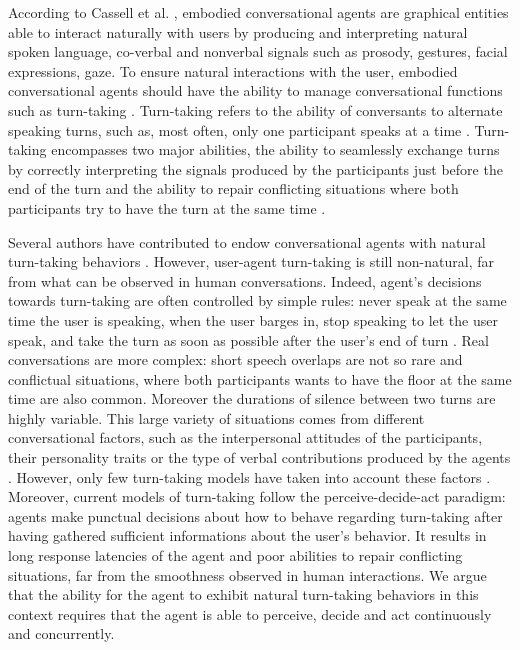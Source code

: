 According to Cassell et al. \cite{cassell_embodiment_1999}, embodied conversational agents are graphical entities able to interact naturally with users by producing and interpreting natural spoken language, co-verbal and nonverbal signals such as prosody, gestures, facial expressions, gaze. 
To ensure natural interactions with the user, embodied conversational agents should have the ability to manage conversational functions such as turn-taking \citep{cassell_embodiment_1999}. Turn-taking refers to the ability of conversants to alternate speaking turns, such as, most often, only one participant speaks at a time \citep{sacks_simplest_1974}. Turn-taking encompasses two major abilities, the ability to seamlessly exchange turns by correctly interpreting the signals produced by the participants just before the end of the turn
and the ability to repair conflicting situations where both participants try to have the turn at the same time \citep{thorisson_natural_2002}. 

Several authors have contributed to endow conversational agents with natural turn-taking behaviors \citep{thorisson_natural_2002,raux_optimizing_2012,jonsdottir_distributed_2013}. However, user-agent turn-taking is still non-natural, far from what can be observed in human conversations. Indeed, agent's decisions towards turn-taking are often controlled by simple rules: never speak at the same time the user is speaking, when the user barges in, stop speaking to let the user speak, and take the turn as soon as possible after the user's end of turn \citep{ter_maat_how_2010}. Real conversations are more complex: short speech overlaps are not so rare and conflictual situations, where both participants wants to have the floor at the same time are also common. Moreover the durations of silence between two turns are highly variable. This large variety of situations comes from different conversational factors, such as the interpersonal attitudes of the participants, their personality traits \citep{ter_maat_how_2010} or the type of verbal contributions produced by the agents \citep{cafaro_effects_2016}. However, only few turn-taking models have taken into account these factors \citep{lessmann_towards_2004,ravenet_conversational_2015}.
Moreover, current models of turn-taking follow the perceive-decide-act paradigm: agents make punctual decisions about how to behave regarding turn-taking after having gathered sufficient informations about the user's behavior. It results in long response latencies of the agent and poor abilities to repair conflicting situations, far from the smoothness observed in human interactions. We argue that the ability for the agent to exhibit natural turn-taking behaviors in this context requires that the agent is able to perceive, decide and act continuously and concurrently.  

